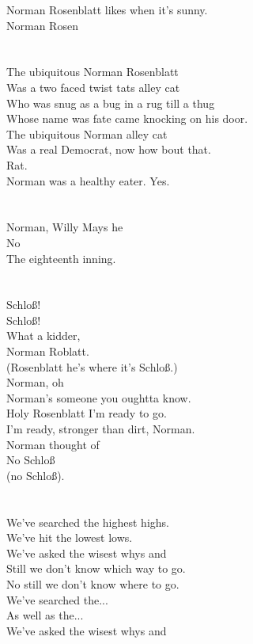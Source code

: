 \documentclass[a4paper]{book}
\begin{document}
Norman Rosenblatt likes when it's sunny.\\
Norman Rosen\\
\\\hfill\\
The ubiquitous Norman Rosenblatt\\
Was a two faced twist tats alley cat\\
Who was snug as a bug in a rug till a thug\\
Whose name was fate came knocking on his door.\\
The ubiquitous Norman alley cat\\
Was a real Democrat, now how bout that.\\
Rat.\\
Norman was a healthy eater.  Yes.\\
\\\hfill\\
Norman, Willy Mays he\\
No\\
The eighteenth inning.\\
\\\hfill\\
Schlo\ss{}!\\
Schlo\ss{}!\\
What a kidder,\\
Norman Roblatt.\\
(Rosenblatt he's where it's Schlo\ss{}.)\\
Norman, oh\\
Norman's someone you oughtta know.\\
Holy Rosenblatt I'm ready to go.\\
I'm ready, stronger than dirt, Norman.\\
Norman thought of\\
No Schlo\ss{}\\
(no Schlo\ss{}).\\
\\\hfill\\
We've searched the highest highs.\\
We've hit the lowest lows.\\
We've asked the wisest whys and\\
Still we don't know which way to go.\\
No still we don't know where to go.\\
We've searched the...\\
As well as the...\\
We've asked the wisest whys and\\
\end{document}
